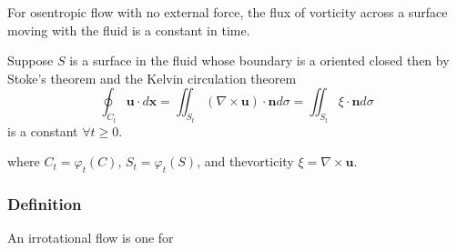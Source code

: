 For osentropic flow with no external force, the flux of vorticity across a surface moving with the fluid is a constant in time.


Suppose $S$ is a surface in the fluid whose boundary is a oriented closed then by Stoke's theorem and the Kelvin circulation theorem
\begin{equation}
\oint_{C_t} \textbf{u} \cdot d\textbf{x} = \iint_{S_t} \left(\nabla \times \textbf{u}\right)\cdot \textbf{n}d\sigma = \iint_{S_t} \xi \cdot \textbf{n}d\sigma
\end{equation}
is a constant $\forall t\geq 0$.

where $C_{t} = \varphi_t(C)$, $S_{t} = \varphi_t(S)$, and thevorticity  $\xi = \nabla \times \textbf{u}$.

\subsubsection{Definition} %

An irrotational flow is one for 


